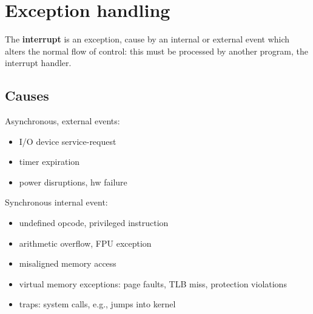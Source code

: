 
\section{Exception handling}\label{sec:exception-handling}
The \textbf{interrupt} is an exception, cause by an internal or external event which alters the normal flow of control: this
must be processed by another program, the interrupt handler.

\subsection{Causes}\label{subsec:causes}
Asynchronous, external events:
\begin{itemize}[noitemsep]
    \item I/O device service-request
    \item timer expiration
    \item power disruptions, hw failure
\end{itemize}

Synchronous internal event:
\begin{itemize}[noitemsep]
    \item undefined opcode, privileged instruction
    \item arithmetic overflow, FPU exception
    \item misaligned memory access
    \item virtual memory exceptions: page faults, TLB miss, protection violations
    \item traps: system calls, e.g., jumps into kernel
\end{itemize}

